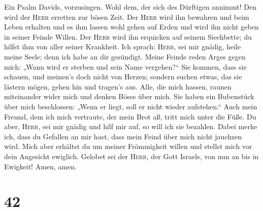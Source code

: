  Ein Psalm Davids, vorzusingen.  Wohl dem,
der sich des Dürftigen annimmt! Den wird der \textsc{Herr} erretten zur
bösen Zeit.  Der \textsc{Herr} wird ihn bewahren und beim
Leben erhalten und es ihm lassen wohl gehen auf Erden und wird ihn nicht
geben in seiner Feinde Willen.  Der \textsc{Herr} wird ihn
erquicken auf seinem Siechbette; du hilfst ihm von aller seiner
Krankheit.  Ich sprach: \textsc{Herr}, sei mir gnädig,
heile meine Seele; denn ich habe an dir gesündigt.  Meine
Feinde reden Arges gegen mich: „Wann wird er sterben und sein Name
vergehen?{}``  Sie kommen, dass sie schauen, und meinen's
doch nicht von Herzen; sondern suchen etwas, das sie lästern mögen,
gehen hin und tragen's aus.  Alle, die mich hassen, raunen
miteinander wider mich und denken Böses über mich.  Sie
haben ein Bubenstück über mich beschlossen: „Wenn er liegt, soll er
nicht wieder aufstehen.``  Auch mein Freund, dem ich mich
vertraute, der mein Brot aß, tritt mich unter die Füße. 
Du aber, \textsc{Herr}, sei mir gnädig und hilf mir auf, so will ich sie
bezahlen.  Dabei merke ich, dass du Gefallen an mir hast,
dass mein Feind über mich nicht jauchzen wird.  Mich aber
erhältst du um meiner Frömmigkeit willen und stellst mich vor dein
Angesicht ewiglich.  Gelobet sei der \textsc{Herr}, der
Gott Israels, von nun an bis in Ewigkeit! Amen, amen.

\hypertarget{section-41}{%
\section{42}\label{section-41}}

